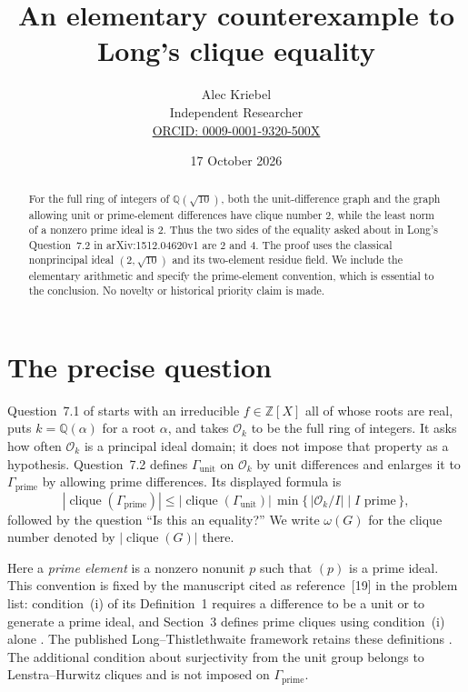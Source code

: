 \documentclass[11pt,letterpaper]{article}
\title{An elementary counterexample to Long's clique equality}
\author{Alec Kriebel\\[2pt]
  \small Independent Researcher\\
  \small\href{https://orcid.org/0009-0001-9320-500X}
  {ORCID: 0009-0001-9320-500X}}
\date{17 October 2026}
\newcommand{\Z}{\mathbb Z}
\newcommand{\Q}{\mathbb Q}
\newcommand{\OO}{\mathcal O}
\newcommand{\Gu}{\Gamma_{\mathrm{unit}}}
\newcommand{\Gp}{\Gamma_{\mathrm{prime}}}
\begin{document}
\maketitle

\begin{abstract}
For the full ring of integers of $\Q(\sqrt{10})$, both the unit-difference
graph and the graph allowing unit or prime-element differences have clique
number $2$, while the least norm of a nonzero prime ideal is $2$. Thus the
two sides of the equality asked about in Long's Question~7.2 in
arXiv:1512.04620v1 are $2$ and $4$. The proof uses the classical
nonprincipal ideal $(2,\sqrt{10})$ and its two-element residue field.
We include the elementary arithmetic and specify the prime-element
convention, which is essential to the conclusion. No novelty or historical
priority claim is made.
\end{abstract}

\section{The precise question}

Question~7.1 of \cite[p.~5]{problems} starts with an irreducible
$f\in\Z[X]$ all of whose roots are real, puts $k=\Q(\alpha)$ for a root
$\alpha$, and takes $\OO_k$ to be the full ring of integers. It asks how
often $\OO_k$ is a principal ideal domain; it does not impose that property
as a hypothesis. Question~7.2 \cite[p.~6]{problems} defines $\Gu$ on
$\OO_k$ by unit differences and enlarges it to $\Gp$ by allowing prime
differences. Its displayed formula is
\begin{equation}\label{eq:printed}
 |\operatorname{clique}(\Gp)|
 \leq |\operatorname{clique}(\Gu)|\,
       \min\{\,|\OO_k/I|\mid I\text{ prime}\,\},
\end{equation}
followed by the question ``Is this an equality?'' We write $\omega(G)$ for
the clique number denoted by $|\operatorname{clique}(G)|$ there.

Here a \emph{prime element} is a nonzero nonunit $p$ such that $(p)$ is a
prime ideal. This convention is fixed by the manuscript cited as
reference~[19] in the problem list: condition~(i) of its Definition~1
requires a difference to be a unit or to generate a prime ideal, and
Section~3 defines prime cliques using condition~(i) alone
\cite[pp.~1, 9]{long-ms}. The published Long--Thistlethwaite framework
retains these definitions \cite[Definition~1, p.~565; Section~3,
p.~572]{long}. The additional condition about surjectivity from the unit
group belongs to Lenstra--Hurwitz cliques and is not imposed on $\Gp$.
\end{document}
